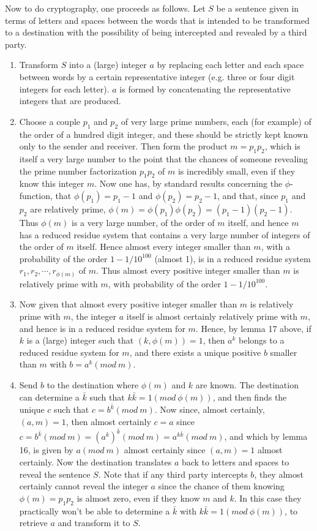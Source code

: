\documentclass[12pt,letterpaper]{book}
\begin{document}
Now to do cryptography, one proceeds as follows. Let $S$ be a sentence given in terms of letters and spaces
between the words that is intended to be transformed to a destination with the possibility of being intercepted
and revealed by a third party.
\begin{enumerate}
\item Transform $S$ into a (large) integer $a$ by replacing each letter and each space between words by a
certain representative integer (e.g. three or four digit integers
for each letter). $a$ is formed by concatenating the representative
integers that are produced.

\item Choose a couple $p_1$ and $p_2$ of very large prime numbers, each (for example) of the order of a hundred
digit integer, and these should be strictly kept known only to the sender and receiver. Then form the product
$m=p_1p_2$, which is itself a very large number to the point that the chances of someone revealing the prime
number factorization $p_1p_2$ of $m$ is incredibly small, even if they know this integer $m$. Now one has, by
standard results concerning the $\phi$-function, that $\phi(p_1)=p_1-1$ and $\phi(p_2)=p_2-1$, and that,
since $p_1$ and $p_2$ are relatively prime, $\phi(m)=\phi(p_1)\phi(p_2)=(p_1-1)(p_2-1)$. Thus $\phi(m)$ is a
very large number, of the order of $m$ itself, and hence $m$ has a reduced residue system that contains a very
large number of integers of the order of $m$ itself. Hence almost every integer smaller than $m$, with a
probability of the order $1-1/10^{100}$ (almost 1), is in a reduced residue system $r_1, r_2,\cdots, r_{\phi(m)}$ of $m$.
Thus almost every positive integer smaller than $m$ is relatively prime with $m$, with probability of the
order $1-1/10^{100}$.

\item Now given that almost every positive integer smaller than $m$ is relatively prime with $m$, the integer $a$
itself is almost certainly relatively prime with $m$, and hence is in a reduced residue system for $m$. Hence, by
lemma 17 above, if $k$ is a (large) integer such that $(k,\phi(m))=1$, then $a^k$ belongs to a reduced residue
system for $m$, and there exists a unique positive $b$ smaller than $m$ with $b=a^k(mod\ m)$.

\item Send $b$ to the destination where $\phi(m)$ and $k$ are known. The destination can determine a $\bar{k}$
such that $k\bar{k}=1(mod\ \phi(m))$, and then finds the unique $c$ such that $c=b^{\bar{k}}(mod\ m)$. Now since,
almost certainly, $(a,m)=1$, then almost certainly $c=a$ since
$c=b^{\bar{k}}(mod\ m)=(a^k)^{\bar{k}}(mod\ m)=a^{k\bar{k}}(mod\ m)$, and which by lemma 16, is given by
 $a(mod\ m)$ almost certainly since $(a,m)=1$ almost certainly. Now the destination translates $a$ back to letters
 and spaces to reveal the sentence $S$. Note that if any third party intercepts $b$, they almost certainly cannot
 reveal the integer $a$ since the chance of them knowing $\phi(m)=p_1p_2$ is almost zero, even if they know $m$ and $k$.
 In this case they practically won't be able to determine a $\bar{k}$ with $k\bar{k}=1(mod\ \phi(m))$, to retrieve $a$
 and transform it to $S$.
\end{enumerate}
\end{document}
